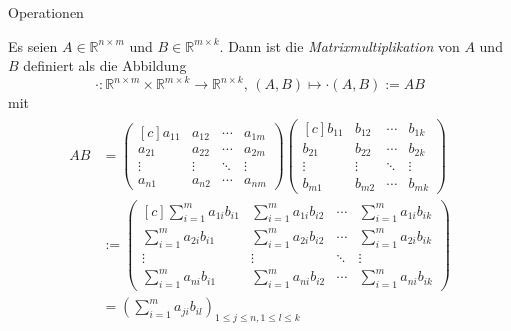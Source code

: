 \documentclass[
  8pt,
  ignorenonframetext,
]{beamer}
\begin{document}
\begin{frame}{Operationen}
\protect\hypertarget{operationen-13}{}
\footnotesize
{}
\begin{definition}[Matrixmultiplikation]
Es seien $A\in \mathbb{R}^{n \times m}$ und $B \in \mathbb{R}^{m \times k}$. Dann
ist  die \textit{Matrixmultiplikation} von $A$ und $B$ definiert als die Abbildung
\begin{equation}
\cdot : \mathbb{R}^{n\times m} \times \mathbb{R}^{m\times k} \to \mathbb{R}^{n \times k}, \,
(A,B) \mapsto \cdot(A,B) := AB
\end{equation}
mit
\begin{align}
\begin{split}
AB
& =
\begin{pmatrix*}[c]
a_{11} & a_{12} & \cdots & a_{1m} \\
a_{21} & a_{22} & \cdots & a_{2m} \\
\vdots & \vdots & \ddots & \vdots \\
a_{n1} & a_{n2} & \cdots & a_{nm}
\end{pmatrix*}
\begin{pmatrix*}[c]
b_{11} & b_{12} & \cdots & b_{1k} \\
b_{21} & b_{22} & \cdots & b_{2k} \\
\vdots & \vdots & \ddots & \vdots \\
b_{m1} & b_{m2} & \cdots & b_{mk}
\end{pmatrix*}
\\
&
:=
\begin{pmatrix*}[c]
\sum_{i=1}^m a_{1i}b_{i1} & \sum_{i=1}^m a_{1i}b_{i2} & \cdots & \sum_{i=1}^m a_{1i}b_{ik}  \\
\sum_{i=1}^m a_{2i}b_{i1} & \sum_{i=1}^m a_{2i}b_{i2} & \cdots & \sum_{i=1}^m a_{2i}b_{ik}  \\
\vdots                    & \vdots                    & \ddots & \vdots                     \\
\sum_{i=1}^m a_{ni}b_{i1} & \sum_{i=1}^m a_{ni}b_{i2} & \cdots & \sum_{i=1}^m a_{ni}b_{ik}
\end{pmatrix*}
\\
&
= \left(\sum_{i=1}^m a_{ji}b_{il} \right)_{1 \le j \le n, 1 \le l \le k}
\end{split}
\end{align}
\end{definition}
\end{frame}
\end{document}
